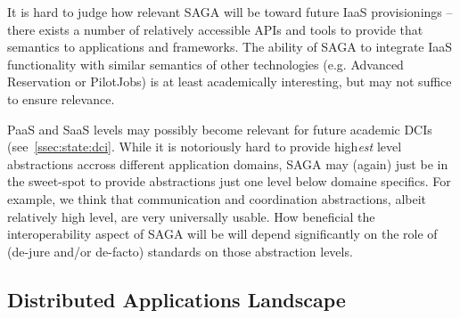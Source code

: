 \documentclass{article}
\newcommand{\I}[1]{\textit{#1}}
\begin{document}

 

  It is hard to judge how relevant SAGA will be toward future IaaS
  provisionings -- there exists a number of relatively accessible APIs
  and tools to provide that semantics to applications and frameworks.
  The ability of SAGA to integrate IaaS functionality with similar
  semantics of other technologies (e.g. Advanced Reservation or
  PilotJobs) is at least academically interesting, but may not suffice
  to ensure relevance.

  PaaS and SaaS levels may possibly become relevant for future
  academic DCIs (see~\ref{ssec:state:dci}.  While it is notoriously
  hard to provide high\I{est} level abstractions accross different
  application domains, SAGA may (again) just be in the sweet-spot to
  provide abstractions just one level below domaine specifics.  For
  example, we think that communication and coordination abstractions,
  albeit relatively high level, are very universally usable.  How
  beneficial the interoperability aspect of SAGA will be will depend
  significantly on the role of (de-jure and/or de-facto) standards on
  those abstraction levels.


 \subsection{Distributed Applications Landscape}
 
\end{document}
